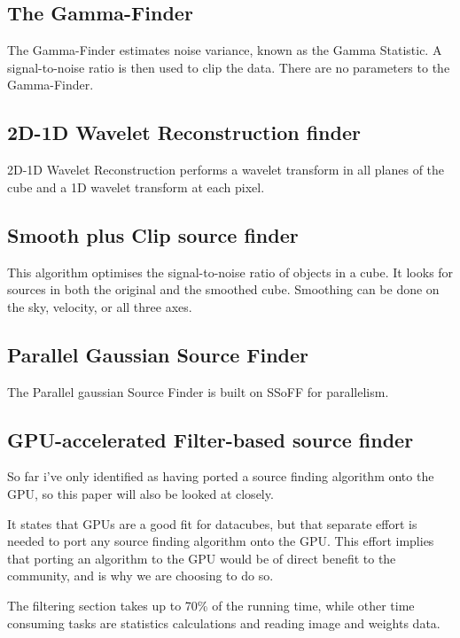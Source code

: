 \documentclass[prodmode,acmtecs]{acmsmall} %
\begin{document}
\subsection{The Gamma-Finder}

The Gamma-Finder \cite{boyce2003gammafinder} estimates noise variance, known as the Gamma Statistic.
A signal-to-noise ratio is then used to clip the data. There are no parameters to the Gamma-Finder.

\subsection{2D-1D Wavelet Reconstruction finder}

2D-1D Wavelet Reconstruction \cite{floer20122d} performs a wavelet transform in all planes
of the cube and a 1D wavelet transform at each pixel.

\subsection{Smooth plus Clip source finder}

This algorithm optimises the signal-to-noise ratio of objects in a cube. It looks for sources
in both the original and the smoothed cube. Smoothing can be done on the sky, velocity, or 
all three axes. \cite{serra2012atlas3d}

\subsection{Parallel Gaussian Source Finder}

The Parallel gaussian Source Finder is built on SSoFF \cite{westerlund2014framework} for parallelism.

\subsection{GPU-accelerated Filter-based source finder}

So far i've only identified \cite{westerlund2015performance} as having ported a source finding
algorithm onto the GPU, so this paper will also be looked at closely.

It states that GPUs are a good fit for datacubes, but that separate effort is needed to port any source
finding algorithm onto the GPU. This effort implies that porting an algorithm to the GPU 
would be of direct benefit to the community, and is why we are choosing to do so.

The filtering section takes up to 70\% of the running time, while other time
consuming tasks are statistics calculations and reading image and weights data.
\end{document}
